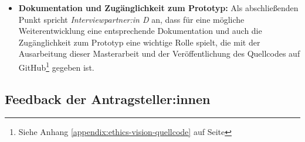 \documentclass[a4paper,12pt,twoside]{scrreprt}
\begin{document}
\begin{itemize}
    \item \textbf{Dokumentation und Zugänglichkeit zum Prototyp:} Als abschließenden Punkt spricht \textit{Interviewpartner:in D} an, dass für eine mögliche Weiterentwicklung eine entsprechende Dokumentation und auch die Zugänglichkeit zum Prototyp eine wichtige Rolle spielt, die mit der Ausarbeitung dieser Masterarbeit und der Veröffentlichung des Quellcodes auf GitHub\footnote{Siehe Anhang \ref{appendix:ethics-vision-quellcode} auf Seite \pageref{appendix:ethics-vision-quellcode}} gegeben ist.
\end{itemize}

\subsection{Feedback der Antragsteller:innen}
\label{sub-sec:feedback-antragsteller}
\end{document}
